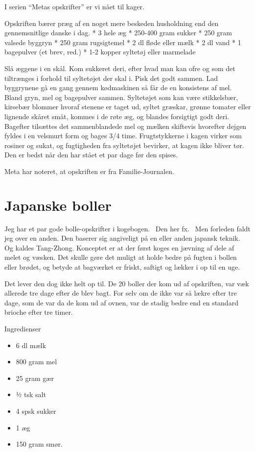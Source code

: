 \documentclass[
]{book}
\providecommand{\tightlist}{%
  \setlength{\itemsep}{0pt}\setlength{\parskip}{0pt}}
\begin{document}
I serien ``Metas opskrifter'' er vi nået til kager.

Opskriften bærer præg af en noget mere beskeden husholdning end den gennemsnitlige danske i dag.
* 3 hele æg
* 250-400 gram sukker
* 250 gram valsede byggryn
* 250 gram rugsigtemel
* 2 dl fløde eller mælk
* 2 dl vand
* 1 bagepulver (et brev, red.)
* 1-2 kopper syltetøj eller marmelade

Slå æggene i en skål. Kom sukkeret deri, efter hvad man kan ofre og som det tiltrænges i forhold til syltetøjet der skal i.
Pisk det godt sammen.
Lad byggrynene gå en gang gennem kødmaskinen så får de en konsistens af mel.
Bland gryn, mel og bagepulver sammen. Syltetøjet som kan være stikkelsbær, kirsebær blommer hvoraf stenene er taget ud, syltet græskar, grønne tomater eller lignende skåret småt, kommes i de
røte æg, og blandes forsigtigt godt deri.
Bagefter tilsættes det sammenblandede mel og mælken skiftevis hvorefter dejgen fyldes i en velsmurt form og bages 3/4 time.
Frugtstykkerne i kagen virker som rosiner og sukat, og fugtigheden fra syltetøjet bevirker, at kagen ikke bliver tør. Den er bedst når den har stået et par dage før den spises.

Meta har noteret, at opskriften er fra Familie-Journalen.

\section{Japanske boller}\label{japanske-boller}

Jeg har et par gode bolle-opskrifter i kogebogen.~ Den her fx. ~Men forleden faldt jeg over en anden. Den baserer sig angiveligt på en eller anden japansk teknik. Og kaldes Tang-Zhong. Konceptet er at der først koges en jævning af dele af melet og væsken. Det skulle gøre det muligt at holde bedre på fugten i bollen eller brødet, og betyde at bagværket er friskt, saftigt og lækker i op til en uge.

Det lever den dog ikke helt op til. De 20 boller der kom ud af opskriften, var væk allerede tre dage efter de blev bagt. For selv om de ikke var så lækre efter tre dage, som de var da de kom ud af ovnen, var de stadig bedre end en standard brioche efter tre timer.

Ingredienser

\begin{itemize}
\tightlist
\item
  6 dl mælk
\item
  800 gram mel
\item
  25 gram gær
\item
  ½ tsk salt
\item
  4 spsk sukker
\item
  1 æg
\item
  150 gram smør.
\end{itemize}
\end{document}
